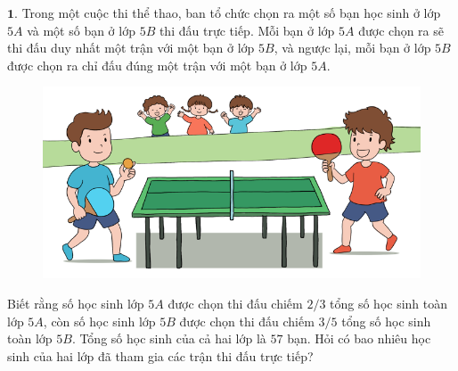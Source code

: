 \begin{multicols}{2}
	$\pmb{1.}$	Trong một cuộc thi thể thao, ban tổ chức chọn ra một số bạn học sinh ở lớp $5A$ và một số bạn ở lớp $5B$ thi đấu trực tiếp. Mỗi bạn ở lớp $5A$ được chọn ra sẽ thi đấu duy nhất một trận với một bạn ở lớp $5B$, và ngược lại, mỗi bạn ở lớp $5B$ được chọn ra chỉ đấu đúng một trận với một bạn ở lớp $5A$.
	\begin{figure}[H]
		\centering
		\vspace*{-5pt}
		\captionsetup{labelformat= empty, justification=centering}
		\includegraphics[width=1\linewidth]{Pi5_bai1}
		\vspace*{-15pt}
	\end{figure}
	Biết rằng số học sinh lớp $5A$ được chọn thi đấu chiếm $2/3$ tổng số học sinh toàn lớp $5A$, còn số học sinh lớp $5B$ được chọn thi đấu chiếm $3/5$ tổng số học sinh toàn lớp $5B$. Tổng số học sinh của cả hai lớp là $57$ bạn. Hỏi có bao nhiêu học sinh của hai lớp đã tham gia các trận thi đấu trực tiếp?
	

\end{multicols}
